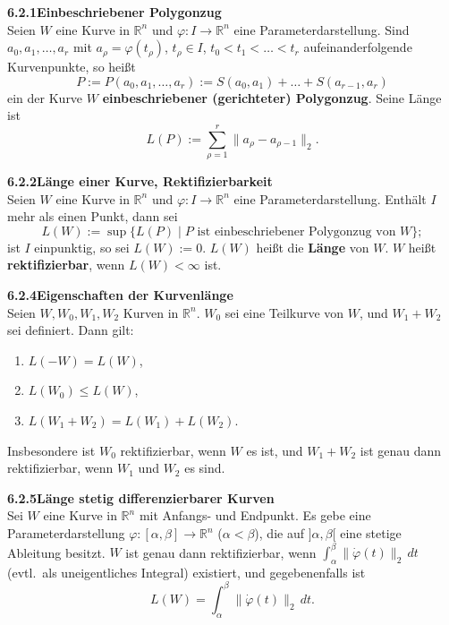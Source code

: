 \documentclass[a4paper,12pt]{article}
\newcommand{\gentry}[3]{%
  \noindent\textbf{#1\quad #2}\nopagebreak\\[0.2em]
  #3\par\smallskip
}
\begin{document}
\gentry{6.2.1}{Einbeschriebener Polygonzug}{%
  Seien $W$ eine Kurve in $\mathbb{R}^n$ und $\varphi : I \longrightarrow \mathbb{R}^n$ eine
  Parameterdarstellung. Sind $a_0, a_1, \ldots, a_r$ mit $a_\rho = \varphi(t_\rho)$,
  $t_\rho \in I$, $t_0 < t_1 < \ldots < t_r$ aufeinanderfolgende Kurvenpunkte, so heißt
  \[
    P := P(a_0, a_1, \ldots, a_r) := S(a_0, a_1) + \ldots + S(a_{r-1}, a_r)
  \]
  ein der Kurve $W$ \textbf{einbeschriebener (gerichteter) Polygonzug}. Seine Länge ist
  \[
    L(P) := \sum_{\rho=1}^{r} \|a_\rho - a_{\rho-1}\|_2.
  \]
}

\gentry{6.2.2}{Länge einer Kurve, Rektifizierbarkeit}{%
  Seien $W$ eine Kurve in $\mathbb{R}^n$ und $\varphi : I \longrightarrow \mathbb{R}^n$ eine
  Parameterdarstellung. Enthält $I$ mehr als einen Punkt, dann sei
  \[
    L(W) := \sup \{L(P) \mid P \text{ ist einbeschriebener Polygonzug von } W\};
  \]
  ist $I$ einpunktig, so sei $L(W) := 0$. $L(W)$ heißt die \textbf{Länge} von $W$.
  $W$ heißt \textbf{rektifizierbar}, wenn $L(W) < \infty$ ist.
}

\gentry{6.2.4}{Eigenschaften der Kurvenlänge}{%
  Seien $W, W_0, W_1, W_2$ Kurven in $\mathbb{R}^n$. $W_0$ sei eine Teilkurve von $W$,
  und $W_1 + W_2$ sei definiert. Dann gilt:
  \begin{enumerate}[label=(\roman*),topsep=2pt,itemsep=1pt]
    \item $L(-W) = L(W)$,
    \item $L(W_0) \leq L(W)$,
    \item $L(W_1 + W_2) = L(W_1) + L(W_2)$.
  \end{enumerate}
  Insbesondere ist $W_0$ rektifizierbar, wenn $W$ es ist, und $W_1 + W_2$ ist genau dann
  rektifizierbar, wenn $W_1$ und $W_2$ es sind.
}

\gentry{6.2.5}{Länge stetig differenzierbarer Kurven}{%
  Sei $W$ eine Kurve in $\mathbb{R}^n$ mit Anfangs- und Endpunkt. Es gebe eine
  Parameterdarstellung $\varphi : [\alpha, \beta] \longrightarrow \mathbb{R}^n$
  ($\alpha < \beta$), die auf $]\alpha, \beta[$ eine stetige Ableitung besitzt.
  $W$ ist genau dann rektifizierbar, wenn $\int_\alpha^\beta \|\dot{\varphi}(t)\|_2\,dt$
  (evtl.\ als uneigentliches Integral) existiert, und gegebenenfalls ist
  \[
    L(W) = \int_\alpha^\beta \|\dot{\varphi}(t)\|_2\, dt.
  \]
}
\end{document}
